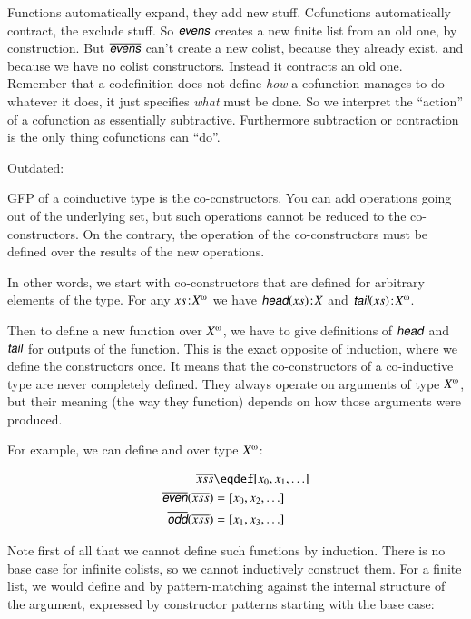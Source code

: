 \documentclass{article}
\begin{document}
Functions automatically expand, they add new stuff. Cofunctions
automatically contract, the exclude stuff. So \(\defn{evens}\) creates
a new finite list from an old one, by construction. But
\(\codefn{evens}\) can't create a new colist, because they already
exist, and because we have no colist constructors. Instead it
contracts an old one. Remember that a codefinition does not define
\textit{how} a cofunction manages to do whatever it does, it just
specifies \textit{what} must be done. So we interpret the ``action''
of a cofunction as essentially subtractive. Furthermore subtraction or
contraction is the only thing cofunctions can ``do''.

Outdated:

GFP of a coinductive type is the co-constructors. You can add
operations going out of the underlying set, but such operations cannot
be reduced to the co-constructors. On the contrary, the operation of
the co-constructors must be defined over the results of the new
operations.

In other words, we start with co-constructors that are defined for
arbitrary elements of the type. For any \(\tj{\seq{x}}{\colist X}\) we have
\(\tj{\head(\seq{x})}{X}\) and \(\tj{\tail(\seq{x})}{\colist X}\).

Then to define a new function over \(\colist X\), we have to give
definitions of \(\head\) and \(\tail\) for outputs of the function.
This is the exact opposite of induction, where we define the
constructors once. It means that the co-constructors of a co-inductive
type are never completely defined. They always operate on arguments of
type \(\colist X\), but their meaning (the way they function) depends
on how those arguments were produced.

For example, we can define  and  over type
\(\colist{X}\):

\begin{align}
  \coseq{\seq{x}} & \defeq [x_0, x_1, \ldots] \\
  \codefn{even}(\coseq{\seq{x}}) & = [x_0, x_2, \ldots] \\
  \codefn{odd}(\coseq{\seq{x}})  & = [x_1, x_3, \ldots]
\end{align}

Note first of all that we cannot define such functions by induction.
There is no base case for infinite colists, so we cannot inductively
construct them. For a finite list, we would define  and
 by pattern-matching against the internal structure of the
argument, expressed by constructor patterns starting with the base case:
\end{document}
